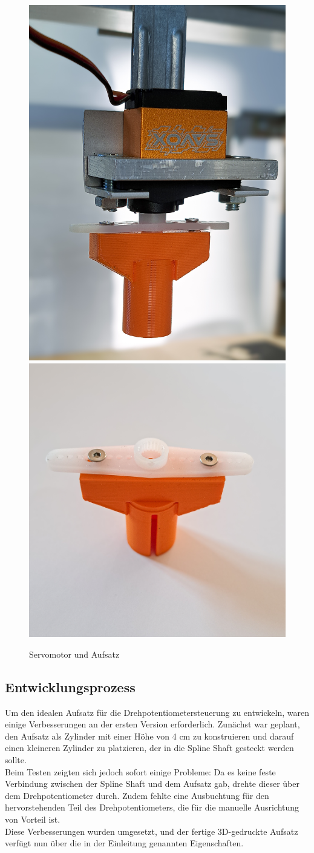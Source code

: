 \begin{figure}[H]
	\centering
	\includegraphics[width=0.3\linewidth]{images/Servomotor+Aufsatz.jpg}
	\includegraphics[width=0.39\linewidth]{images/Aufsatz-Servo.jpg}
	\caption[Servomotor und Aufsatz]{Servomotor und Aufsatz}
	\label{fig:Servomotor und Aufsatz}
\end{figure}



\subsection{Entwicklungsprozess}
Um den idealen Aufsatz für die Drehpotentiometersteuerung zu entwickeln, waren einige Verbesserungen an der ersten Version erforderlich. Zunächst war geplant, den Aufsatz als Zylinder mit einer Höhe von 4 cm zu konstruieren und darauf einen kleineren Zylinder zu platzieren, der in die Spline Shaft gesteckt werden sollte. \\
Beim Testen zeigten sich jedoch sofort einige Probleme: Da es keine feste Verbindung zwischen der Spline Shaft und dem Aufsatz gab, drehte dieser über dem Drehpotentiometer durch. Zudem fehlte eine Ausbuchtung für den hervorstehenden Teil des Drehpotentiometers, die für die manuelle Ausrichtung von Vorteil ist.\\
Diese Verbesserungen wurden umgesetzt, und der fertige 3D-gedruckte Aufsatz verfügt nun über die in der Einleitung genannten Eigenschaften.

